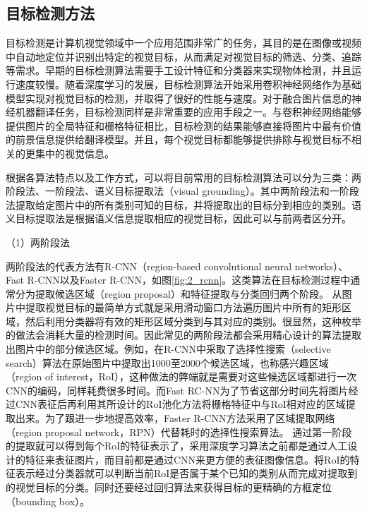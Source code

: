 
\subsection{目标检测方法}
\label{sec:2_object_detection}

目标检测是计算机视觉领域中一个应用范围非常广的任务，其目的是在图像或视频中自动地定位并识别出特定的视觉目标，从而满足对视觉目标的筛选、分类、追踪等需求。早期的目标检测算法需要手工设计特征和分类器来实现物体检测，并且运行速度较慢。随着深度学习的发展，目标检测算法开始采用卷积神经网络作为基础模型实现对视觉目标的检测，并取得了很好的性能与速度。对于融合图片信息的神经机器翻译任务，目标检测同样是非常重要的应用手段之一。与卷积神经网络能够提供图片的全局特征和栅格特征相比，目标检测的结果能够直接将图片中最有价值的前景信息提供给翻译模型。并且，每个视觉目标都能够提供排除与视觉目标不相关的更集中的视觉信息。

根据各算法特点以及工作方式，可以将目前常用的目标检测算法可以分为三类：两阶段法、一阶段法、语义目标提取法（visual grounding）。其中两阶段法和一阶段法提取给定图片中的所有类别可知的目标，并将提取出的目标分到相应的类别。语义目标提取法是根据语义信息提取相应的视觉目标，因此可以与前两者区分开。

{\sffamily （1）两阶段法}

两阶段法的代表方法有R-CNN（region-based convolutional neural networks）\cite{DBLP:conf/cvpr/GirshickDDM14}、Fast R-CNN\cite{DBLP:conf/iccv/Girshick15}以及Faster R-CNN\cite{DBLP:conf/nips/RenHGS15}，如图\ref{fig:2_rcnn}。这类算法在目标检测过程中通常分为提取候选区域（region proposal）和特征提取与分类回归两个阶段。
从图片中提取视觉目标的最简单方式就是采用滑动窗口方法遍历图片中所有的矩形区域，然后利用分类器将有效的矩形区域分类到与其对应的类别。很显然，这种枚举的做法会消耗大量的检测时间。因此常见的两阶段法都会采用精心设计的算法提取出图片中的部分候选区域。例如，在R-CNN中采取了选择性搜索（selective search）算法在原始图片中提取出1000至2000个候选区域，也称感兴趣区域（region of interest，RoI），这种做法的弊端就是需要对这些候选区域都进行一次CNN的编码，同样耗费很多时间。而Fast RC-NN为了节省这部分时间先将图片经过CNN表征后再利用其所设计的RoI池化方法将栅格特征中与RoI相对应的区域提取出来。为了跟进一步地提高效率，Faster R-CNN方法采用了区域提取网络（region proposal network，RPN）代替耗时的选择性搜索算法。
通过第一阶段的提取就可以得到每个RoI的特征表示了，采用深度学习算法之前都是通过人工设计的特征来表征图片，而目前都是通过CNN来更方便的表征图像信息。将RoI的特征表示经过分类器就可以判断当前RoI是否属于某个已知的类别从而完成对提取到的视觉目标的分类。同时还要经过回归算法来获得目标的更精确的方框定位（bounding box）。

